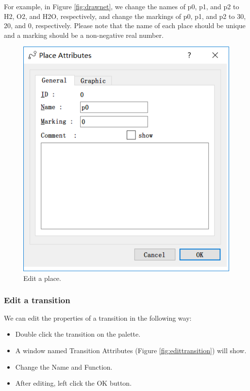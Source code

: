 \documentclass[journal,a4paper,onecolumn]{article}
\begin{document}
For example, in Figure \ref{fig:drawnet}, we change the names of p0, p1, and p2 to H2, O2, and H2O, respectively, and change the markings of p0, p1, and p2 to 30, 20, and 0, respectively. Please note that the name of each place should be unique and a marking should be a non-negative real number.

\begin{figure}[!hbt]
	\begin{center}
		\includegraphics[width=0.8\columnwidth]{fig3}
		\caption{Edit a place.}
		\label{fig:editplace}
	\end{center}
\end{figure}


\subsubsection{Edit a transition}
We can edit the properties of a transition in the following way:

\begin{itemize}
	\item Double click the transition on the palette.
	\item A window named Transition Attributes (Figure \ref{fig:edittransition}) will show.
	\item Change the Name and Function.
	\item After editing, left click the OK button.
\end{itemize}
\end{document}
